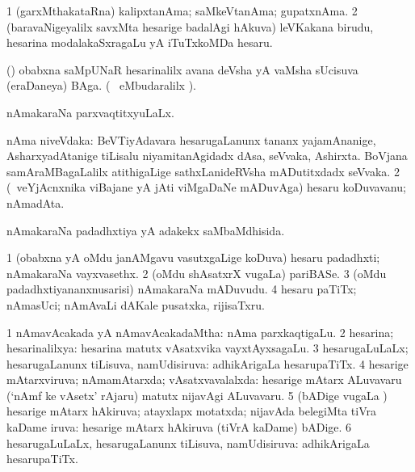 \bentry
{}
\gl{\nA}
\bmng
\bnum
\num{1} (garxMthakataRna) kalipxtanAma; saMkeVtanAma; gupatxnAma. 
\num{2} (baravaNigeyalilx savxMta hesarige badalAgi hAkuva) leVKakana birudu, hesarina modalakaSxragaLu yA iTuTxkoMDa hesaru. 
\enum
\emng
\eentry

\bentry
{}
\gl{\nA}
\bmng
(\roVpu) obabxna saMpUNaR hesarinalilx avana deVsha yA vaMsha sUcisuva (eraDaneya) BAga. (\udA\  eMbudaralilx ). 
\emng
\eentry

\bentry
{}
\gl{\gu}
\bmng
nAmakaraNa parxvaqtitxyuLaLx. 
\emng
\eentry

\bentry
{}
\gl{\nA}
\bmng
\bnum
{} nAma niveVdaka: 
\banum
{} BeVTiyAdavara hesarugaLanunx tananx yajamAnanige, AsharxyadAtanige tiLisalu niyamitanAgidadx dAsa, seVvaka, Ashirxta. 
 BoVjana samAraMBagaLalilx atithigaLige sathxLanideRVsha mADutitxdadx seVvaka. 
\eanum
\numie
\num{2} (\kanmu\ veYjAcnxnika viBajane yA jAti viMgaDaNe mADuvAga) hesaru koDuvavanu; nAmadAta. 
\enum
\emng
\eentry

\bentry
{}
\gl{\gu}
\bmng
nAmakaraNa padadhxtiya yA adakekx saMbaMdhisida. 
\emng
\eentry

\bentry
{}
\gl{\nA}
\bmng
\bnum
\num{1} (obabxna yA oMdu janAMgavu vasutxgaLige koDuva) hesaru padadhxti; nAmakaraNa vayxvasethx. 
\num{2} (oMdu shAsatxrX \mo vugaLa) pariBASe. 
\num{3} (oMdu padadhxtiyananxnusarisi) nAmakaraNa mADuvudu. 
\num{4} hesaru paTiTx; nAmasUci; nAmAvaLi dAKale pusatxka, rijisaTxru. 
\enum
\emng
\eentry

\bentry
{}
\gl{\gu}
\bmng
\bnum
\num{1} nAmavAcakada yA nAmavAcakadaMtha:  nAma parxkaqtigaLu. 
\num{2} hesarina; hesarinalilxya:  hesarina matutx vAsatxvika vayxtAyxsagaLu. 
\num{3} hesarugaLuLaLx; hesarugaLanunx tiLisuva, namUdisiruva:  adhikArigaLa hesarupaTiTx. 
\num{4} hesarige mAtarxviruva; nAmamAtarxda; vAsatxvavalalxda:  hesarige mAtarx ALuvavaru (`nAmf ke vAsetx' rAjaru) matutx nijavAgi ALuvavaru. 
\num{5} (bADige \mo vugaLa \vi) hesarige mAtarx hAkiruva; atayxlapx motatxda; nijavAda belegiMta tiVra kaDame iruva:  hesarige mAtarx hAkiruva (tiVrA kaDame) bADige. 
\num{6} hesarugaLuLaLx, hesarugaLanunx tiLisuva, namUdisiruva:  adhikArigaLa hesarupaTiTx. 
\enum
\emng
\eentry

